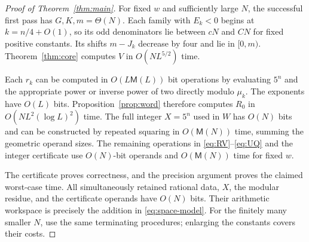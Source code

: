\documentclass[11pt]{article}
\numberwithin{equation}{section}
\theoremstyle{definition}
\newcommand{\M}{\mathsf M}
\begin{document}
\begin{proof}[Proof of Theorem~\ref{thm:main}]
For fixed $w$ and sufficiently large $N$, the successful
first pass has $G,K,m=\Theta(N)$. Each family with $E_k<0$
begins at $k=n/4+O(1)$, so its odd denominators lie between
$cN$ and $CN$ for fixed positive constants. Its shifts
$m-J_k$ decrease by four and lie in $[0,m)$.
Theorem~\ref{thm:core} computes $V$ in $O(NL^{5/2})$ time.

Each $r_k$ can be computed in $O(L\M(L))$ bit operations
by evaluating $5^n$ and the appropriate power or inverse
power of two directly modulo $\mu_k$. The exponents have
$O(L)$ bits. Proposition~\ref{prop:word} therefore computes
$R_0$ in $O(NL^2(\log L)^2)$ time.
The full integer $X=5^n$ used in $W$ has $O(N)$ bits
and can be constructed by repeated squaring in
$O(\M(N))$ time, summing the geometric operand sizes.
The remaining operations in \eqref{eq:RV}--\eqref{eq:UQ}
and the integer certificate use $O(N)$-bit operands
and $O(\M(N))$ time for fixed $w$.

The certificate proves correctness, and the precision
argument proves the claimed worst-case time. All simultaneously
retained rational data, $X$, the modular residue, and the
certificate operands have $O(N)$ bits. Their arithmetic
workspace is precisely the addition in \eqref{eq:space-model}.
For the finitely many smaller $N$, use the same terminating
procedures; enlarging the constants covers their costs.
\end{proof}
\end{document}

